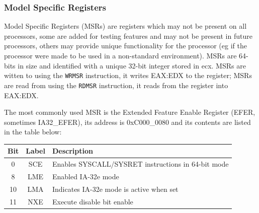 \documentclass{article}
\newcommand{\layout}[1]{\parbox{\linewidth}{#1}}
\begin{document}
\layout{
  \subsubsection{Model Specific Registers}

  Model Specific Registers (MSRs) are registers which may not be present on all processors, some are added for testing features and may not be present in future processors, others may provide unique functionality for the processor (eg if the processor were made to be used in a non-standard environment).
  MSRs are 64-bits in size and identified with a unique 32-bit integer stored in ecx.
  MSRs are witten to using the \texttt{WRMSR} instruction, it writes EAX:EDX to the register;
  MSRs are read from using the \texttt{RDMSR} instruction, it reads from the register into EAX:EDX.

  \bigskip \cite[Chapter~11.4]{sdm3}
} \bigskip

\layout{
  The most commonly used MSR is the Extended Feature Enable Register (EFER, sometimes IA32\_EFER), its address is 0xC000\_0080 and its contents are listed in the table below:
  \begin{table}[H]
    \centering
    \begin{tabular}{|c|c|l|}
      \hline \textbf{Bit} & \textbf{Label} & \textbf{Description} \\ \hline
      0 & SCE & Enables SYSCALL/SYSRET instructions in 64-bit mode \\
      8 & LME & Enabled IA-32e mode \\
      10 & LMA & Indicates IA-32e mode is active when set \\
      11 & NXE & Execute disable bit enable \\ \hline
    \end{tabular}
  \end{table}

  \cite[Page~2-87]{sdm4}
} \bigskip
\end{document}
